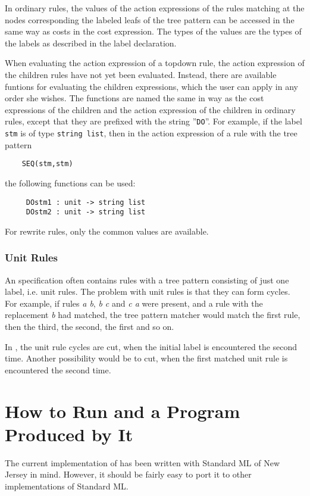In ordinary rules, the values of the action expressions of
the rules matching at the nodes corresponding the labeled leafs of
the tree pattern can be accessed in the same way as costs in the
cost expression. The types of the values are the types of the labels
as described in the label declaration.

When evaluating the action expression of a topdown rule, the action
expression of the children rules have not yet been evaluated. Instead,
there are available funtions for evaluating the children expressions,
which the user can apply in any order she wishes. The functions are
named the same in way as the cost expressions of the children and the
action expression of the children in ordinary rules, except that they
are prefixed with the string ''{\tt DO}''. For example, if the
label {\tt stm} is of type {\tt string list}, then in the action
expression of a rule with the tree pattern
\begin{verbatim}
    SEQ(stm,stm)
\end{verbatim}
the following functions can be used:
\begin{verbatim}
     DOstm1 : unit -> string list
     DOstm2 : unit -> string list
\end{verbatim}
For rewrite rules, only the common values are available.

\subsubsection{Unit Rules}
An \mltwig specification often contains rules with a tree pattern
consisting of just one label, i.e. unit rules. The problem with
unit rules is that they can form cycles. For example, if rules {\em a b},
{\em b c} and {\em c a} were present, and a rule with the replacement
{\em b} had matched, the tree pattern matcher would match the first
rule, then the third, the second, the first and so on.

In \mltwig, the unit rule cycles are cut, when the initial label is
encountered the second time. Another possibility would be to cut, when
the first matched unit rule is encountered the second time.

\section{How to Run \mltwig and a Program Produced by It}
The current implementation of \mltwig has been written with
Standard ML of New Jersey in mind. However, it should
be fairly easy to port it to other implementations of Standard ML.

